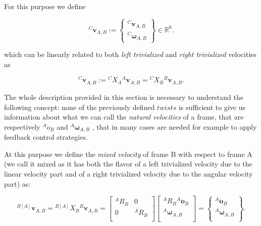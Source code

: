     For this purpose we define

    \begin{equation}
    {}^{C} \mathbf{v}_{A,B} := \begin{Bmatrix} {}^{C}\bm{v}_{A,B} \\ {}^{C}\bm{\omega}_{A,B} \end{Bmatrix} \in \mathbb{R}^6.
    \end{equation}

    which can be linearly related to both \textit{left trivialized} and \textit{right trivialized} velocities as

    \begin{equation}
    {}^{C} \mathbf{v}_{A,B} := {}^{C} {X}_A {}^{A} \mathbf{v}_{A,B} = {}^{C} {X}_B {}^{B} \mathbf{v}_{A,B}.
    \end{equation}

    The whole description provided in this section is necessary to understand the following concept:
    none of the previously defined $twists$ is sufficient to give us information about what we can call the \textit{natural velocities} of a frame, that are respectively ${}^{A} {\dot{o}}_B$ and ${}^{A}\bm{\omega}_{A,B}$ \cite{Traversaro-Saccon}, that in many cases are needed for example to apply feedback control strategies.

    At this purpose we define the \textit{mixed velocity} of frame B with respect to
    frame A (we call it mixed as it has both the flavor of a left trivialized velocity due
    to the linear velocity part and of a right trivialized velocity due to the angular
    velocity part) as:

    \begin{equation}
    {}^{B[A]} \mathbf{v}_{A,B} = {}^{B[A]} {X}_B {}^{B} \mathbf{v}_{A,B} = \begin{bmatrix} 
    {}^{A} {R}_B & 0 \\
    0 & {}^{A} {R}_B \\
    \end{bmatrix} \begin{bmatrix} 
    {}^{A} {R}_B {}^{A}\dot{ \mathbf{o}}_B \\
    {}^{A}\bm{\omega}_{A,B} \\
    \end{bmatrix} = \begin{Bmatrix} 
    {}^{A}\dot{ \mathbf{o}}_B \\
    {}^{A}\bm{\omega}_{A,B} \\
    \end{Bmatrix}. 
    \end{equation}

